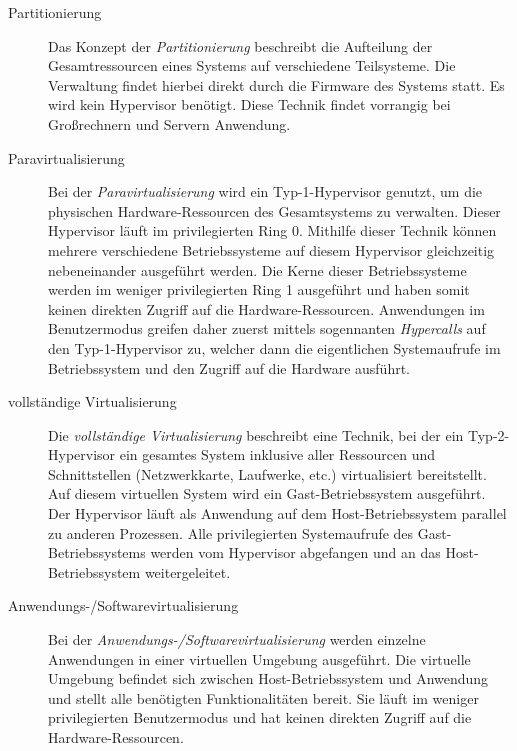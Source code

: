 \begin{description}
    \item[Partitionierung]
        Das Konzept der \textit{Partitionierung} beschreibt die Aufteilung der
        Gesamtressourcen eines Systems auf verschiedene
        Teilsysteme\cite{BSKompakt_Virt}.
        Die Verwaltung findet hierbei direkt durch die Firmware des Systems
        statt.
        Es wird kein Hypervisor benötigt.
        Diese Technik findet vorrangig bei Großrechnern und Servern Anwendung.
    \newpage
    \item[Paravirtualisierung]
        Bei der \textit{Paravirtualisierung} wird ein Typ-1-Hypervisor genutzt,
        um die physischen Hardware-Ressourcen des Gesamtsystems zu verwalten.
        Dieser Hypervisor läuft im privilegierten Ring 0.
        Mithilfe dieser Technik können mehrere verschiedene Betriebssysteme auf
        diesem Hypervisor gleichzeitig nebeneinander ausgeführt
        werden\cite{BSGK_RBrause}.
        Die Kerne dieser Betriebssysteme werden im weniger privilegierten Ring
        1 ausgeführt und haben somit keinen direkten Zugriff auf die
        Hardware-Ressourcen.
        Anwendungen im Benutzermodus greifen daher zuerst mittels sogennanten
        \textit{Hypercalls} auf den Typ-1-Hypervisor zu, welcher dann die
        eigentlichen Systemaufrufe im Betriebssystem und den Zugriff auf die
        Hardware ausführt\cite{BSKompakt_Virt}.
    \item[vollständige Virtualisierung]
        Die \textit{vollständige Virtualisierung} beschreibt eine Technik, bei
        der ein Typ-2-Hypervisor ein gesamtes System inklusive aller Ressourcen
        und Schnittstellen (Netzwerkkarte, Laufwerke, etc.) virtualisiert
        bereitstellt\cite{BSKompakt_Virt}.
        Auf diesem virtuellen System wird ein Gast-Betriebssystem ausgeführt.
        Der Hypervisor läuft als Anwendung auf dem Host-Betriebssystem
        parallel zu anderen Prozessen.
        Alle privilegierten Systemaufrufe des Gast-Betriebssystems werden vom
        Hypervisor abgefangen und an das Host-Betriebssystem weitergeleitet.
    \item[Anwendungs-/Softwarevirtualisierung]
        Bei der \textit{Anwendungs-/Softwarevirtualisierung} werden einzelne
        Anwendungen in einer virtuellen Umgebung ausgeführt.
        Die virtuelle Umgebung befindet sich zwischen Host-Betriebssystem und
        Anwendung und stellt alle benötigten Funktionalitäten bereit.
        Sie läuft im weniger privilegierten Benutzermodus und hat keinen
        direkten Zugriff auf die Hardware-Ressourcen\cite{BSKompakt_Virt}.

\end{description}
